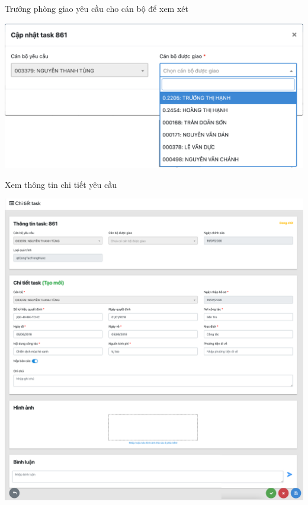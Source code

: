 \newpage
\noindent Trưởng phòng giao yêu cầu cho cán bộ để xem xét
\begin{center}
  \captionsetup{type=figure}
  \includegraphics[width=15cm]{img/test/assignAdmin.png}
\end{center}
Xem thông tin chi tiết yêu cầu
\begin{center}
  \captionsetup{type=figure}
  \includegraphics[width=15cm]{img/test/taskDetailAdmin.png}
\end{center}

